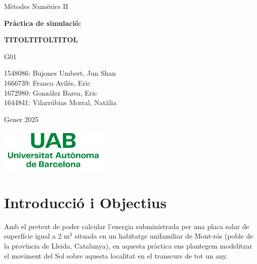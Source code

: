 \documentclass[10pt, twoside, a4paper]{article}
\begin{document}
\begin{titlepage}
\centering
{\LARGE Mètodes Numèrics II \par}
\vspace{2cm}
{\Huge \textbf{Pràctica de simulació:} \par}
\vspace{1cm}
{\Huge \textbf{TITOLTITOLTITOL} \par}
\vspace{3cm}
{\Large G01 \par}
\vspace{0.5cm}
{\Large 1548086: Bujones Umbert, Jun Shan\\1666739: Franco Avilés, Eric\\  1672980: González Barea, Eric\\1644841: Vilarrúbias Morral, Natàlia \par}
\vspace{2cm}
{\Large Gener 2025 \par}
\vspace{2cm}
\includegraphics[width=0.4\textwidth]{Logo_UAB.png}


\end{titlepage}

\renewcommand{\cftsecfont}{}
\renewcommand{\cftsecpagefont}{}
\renewcommand{\cftsecleader}{\cftdotfill{\cftdotsep}}
\renewcommand{\cftdotsep}{0.2}
\setlength{\cftbeforesecskip}{0.5em}
\setlength{\cftbeforesubsecskip}{0.5em}
\tableofcontents

\newpage
{}
\setcounter{page}{1}

\pagestyle{fancy}

\section{Introducció i Objectius}
Amb el pretext de poder calcular l'energia subministrada per una placa solar de superfície igual a 2 m$^3$ situada en un habitatge unifamiliar de Mont-rós (poble de la província de Lleida, Catalunya), en aquesta pràctica ens plantegem modelitzar el moviment del Sol sobre aquesta localitat en el transcurs de tot un any. 
\end{document}
